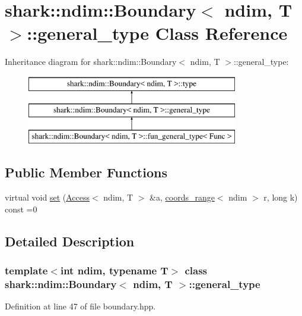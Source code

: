\hypertarget{classshark_1_1ndim_1_1_boundary_1_1general__type}{}\section{shark\+:\+:ndim\+:\+:Boundary$<$ ndim, T $>$\+:\+:general\+\_\+type Class Reference}
\label{classshark_1_1ndim_1_1_boundary_1_1general__type}
Inheritance diagram for shark\+:\+:ndim\+:\+:Boundary$<$ ndim, T $>$\+:\+:general\+\_\+type\+:\begin{figure}[H]
\begin{center}
\leavevmode
\includegraphics[height=3.000000cm]{classshark_1_1ndim_1_1_boundary_1_1general__type}
\end{center}
\end{figure}
\subsection*{Public Member Functions}
\begin{DoxyCompactItemize}
\item 
virtual void \hyperlink{classshark_1_1ndim_1_1_boundary_1_1general__type_ac73340187c707591d7fc1ccbe85c1b19}{set} (\hyperlink{classshark_1_1ndim_1_1_access}{Access}$<$ ndim, T $>$ \&a, \hyperlink{structshark_1_1ndim_1_1coords__range}{coords\+\_\+range}$<$ ndim $>$ r, long k) const =0
\end{DoxyCompactItemize}


\subsection{Detailed Description}
\subsubsection*{template$<$int ndim, typename T$>$\newline
class shark\+::ndim\+::\+Boundary$<$ ndim, T $>$\+::general\+\_\+type}



Definition at line 47 of file boundary.\+hpp.



